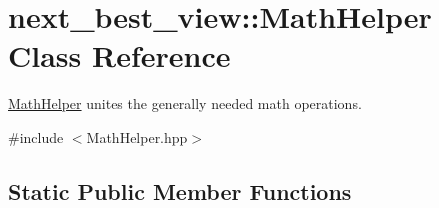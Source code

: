 \hypertarget{classnext__best__view_1_1MathHelper}{\section{next\-\_\-best\-\_\-view\-:\-:\-Math\-Helper \-Class \-Reference}
\label{classnext__best__view_1_1MathHelper}
}


\hyperlink{classnext__best__view_1_1MathHelper}{\-Math\-Helper} unites the generally needed math operations.  




{\ttfamily \#include $<$\-Math\-Helper.\-hpp$>$}

\subsection*{\-Static \-Public \-Member \-Functions}
